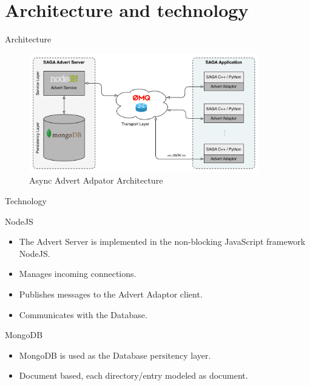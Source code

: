 \documentclass{beamer}
\begin{document}
  \section{Architecture and technology}
    \begin{frame}{Architecture}
      \begin{figure}
        \includegraphics[width=10cm]{new_technology_overview}
        \caption{Async Advert Adpator Architecture}  
      \end{figure}
    \end{frame}
    
    \begin{frame}{Technology}
      \begin{block}{NodeJS}
        \begin{itemize}
          \item The Advert Server is implemented in the non-blocking JavaScript framework NodeJS.
          \item Manages incoming connections.
          \item Publishes messages to the Advert Adaptor client.
          \item Communicates with the Database.
        \end{itemize}
      \end{block}
      
      \begin{block}{MongoDB}
        \begin{itemize}
          \item MongoDB is used as the Database persitency layer.
          \item Document based, each directory/entry modeled as document.
        \end{itemize}
      \end{block}
    \end{frame}
    
\end{document}
